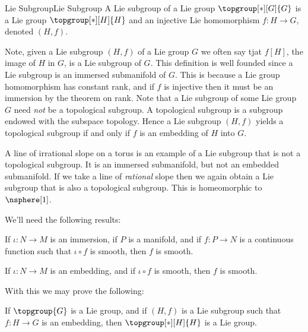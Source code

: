     \begin{fdefinition}{Lie Subgroup}{Lie Subgroup}
        A Lie subgroup of a Lie group $\topgroup[*][G]{G}$ is a Lie
        group $\topgroup[*][H]{H}$ and an injective Lie homomorphism
        $f:H\rightarrow{G}$, denoted $(H,f)$.
    \end{fdefinition}
    Note, given a Lie subgroup $(H,f)$ of a Lie group $G$ we often say
    tjat $f[H]$, the image of $H$ in $G$, is a Lie subgroup of $G$. This
    definition is well founded since a Lie subgroup is an immersed
    submanifold of $G$. This is because a Lie group homomorphism has
    constant rank, and if $f$ is injective then it must be an immersion
    by the theorem on rank. Note that a Lie subgroup of some Lie group
    $G$ need \textit{not} be a topological subgroup. A topological
    subgroup is a subgroup endowed with the subspace topology. Hence a
    Lie subgroup $(H,f)$ yields a topological subgroup if and only if
    $f$ is an embedding of $H$ into $G$.
    \begin{example}
        A line of irrational slope on a torus is an example of a Lie
        subgroup that is not a topological subgroup. It is an immersed
        submanifold, but not an embedded submanifold. If we take a line
        of \textit{rational} slope then we again obtain a Lie subgroup
        that is also a topological subgroup. This is homeomorphic to
        $\nsphere[1]$.
    \end{example}
    We'll need the following results:
    \begin{theorem}
        If $\iota:N\rightarrow{M}$ is an immersion, if $P$ is a
        manifold, and if $f:P\rightarrow{N}$ is a continuous function
        such that $\iota\circ{f}$ is smooth, then $f$ is smooth.
    \end{theorem}
    \begin{theorem}
        If $\iota:N\rightarrow{M}$ is an embedding, and if
        $\iota\circ{f}$ is smooth, then $f$ is smooth.
    \end{theorem}
    With this we may prove the following:
    \begin{theorem}
        If $\topgroup{G}$ is a Lie group, and if $(H,f)$ is a Lie
        subgroup such that $f:H\rightarrow{G}$ is an embedding, then
        $\topgroup[*][H]{H}$ is a Lie group.
    \end{theorem}
